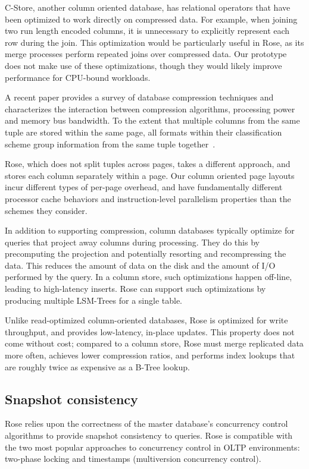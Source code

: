 \documentclass{vldb}
\newcommand{\rows}{Rose\xspace}
\begin{document}
C-Store, another column oriented database, has relational operators
that have been optimized to work directly on compressed
data\cite{compExec}.  For example, when joining two run length encoded
columns, it is unnecessary to explicitly represent each row during the
join.  This optimization would be particularly useful in \rows, as its
merge processes perform repeated joins over compressed data.  Our
prototype does not make use of these optimizations, though they would
likely improve performance for CPU-bound workloads.

A recent paper provides a survey of database compression
techniques and characterizes the interaction between compression
algorithms, processing power and memory bus bandwidth.  To the extent
that multiple columns from the same tuple are stored within the same
page, all formats within their classification scheme group information
from the same tuple together~\cite{bitsForChronos}.

\rows, which does not split tuples across pages, takes a different
approach, and stores each column separately within a page.  Our column
oriented page layouts incur different types of per-page overhead, and
have fundamentally different processor
cache behaviors and instruction-level parallelism properties than the
schemes they consider.

In addition to supporting compression, column databases typically
optimize for queries that project away columns during processing.
They do this by precomputing the projection and potentially resorting
and recompressing the data.  This reduces the amount of data on the
disk and the amount of I/O performed by the query.  In a
column store, such optimizations happen off-line, leading to
high-latency inserts.  \rows can support such optimizations by
producing multiple LSM-Trees for a single table.

Unlike read-optimized column-oriented databases, \rows is optimized
for write throughput, and provides low-latency, in-place updates.
This property does not come without cost; compared to a column
store, \rows must merge replicated data more often, achieves lower
compression ratios, and performs index lookups that are roughly twice
as expensive as a B-Tree lookup.

\subsection{Snapshot consistency}

\rows relies upon the correctness of the master database's concurrency
control algorithms to provide snapshot consistency to queries.  \rows
is compatible with the two most popular approaches to concurrency
control in OLTP environments: two-phase locking and timestamps
(multiversion concurrency control).
\end{document}
